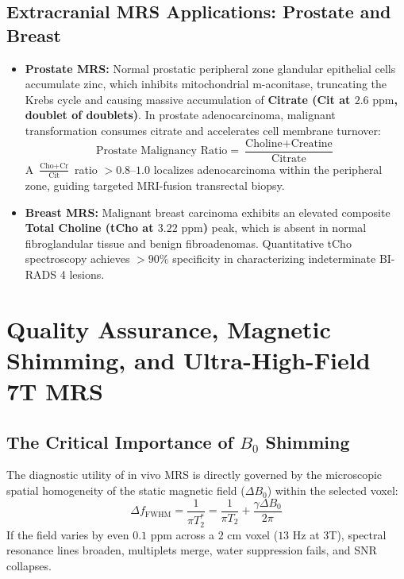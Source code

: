 \documentclass[11pt,a4paper]{article}
\begin{document}
\subsection{Extracranial MRS Applications: Prostate and Breast}
\begin{itemize}[leftmargin=2em]
    \item \textbf{Prostate MRS:} Normal prostatic peripheral zone glandular epithelial cells accumulate zinc, which inhibits mitochondrial m-aconitase, truncating the Krebs cycle and causing massive accumulation of \textbf{Citrate (Cit at $2.6\text{ ppm}$, doublet of doublets)}. In prostate adenocarcinoma, malignant transformation consumes citrate and accelerates cell membrane turnover:
    \begin{equation}
        \text{Prostate Malignancy Ratio} = \frac{\text{Choline} + \text{Creatine}}{\text{Citrate}}
    \end{equation}
    A $\frac{\text{Cho}+\text{Cr}}{\text{Cit}}$ ratio $> 0.8\text{--}1.0$ localizes adenocarcinoma within the peripheral zone, guiding targeted MRI-fusion transrectal biopsy.
    \item \textbf{Breast MRS:} Malignant breast carcinoma exhibits an elevated composite \textbf{Total Choline (tCho at $3.22\text{ ppm}$)} peak, which is absent in normal fibroglandular tissue and benign fibroadenomas. Quantitative tCho spectroscopy achieves $> 90\%$ specificity in characterizing indeterminate BI-RADS 4 lesions.
\end{itemize}

\section{Quality Assurance, Magnetic Shimming, and Ultra-High-Field 7T MRS}

\subsection{The Critical Importance of \texorpdfstring{$B_0$}{B0} Shimming}
The diagnostic utility of in vivo MRS is directly governed by the microscopic spatial homogeneity of the static magnetic field ($\Delta B_0$) within the selected voxel:
\begin{equation}
    \Delta f_{\text{FWHM}} = \frac{1}{\pi T_2^*} = \frac{1}{\pi T_2} + \frac{\gamma \Delta B_0}{2\pi}
\end{equation}
If the field varies by even $0.1\text{ ppm}$ across a $2\text{ cm}$ voxel ($13\text{ Hz}$ at 3T), spectral resonance lines broaden, multiplets merge, water suppression fails, and SNR collapses.
\end{document}
